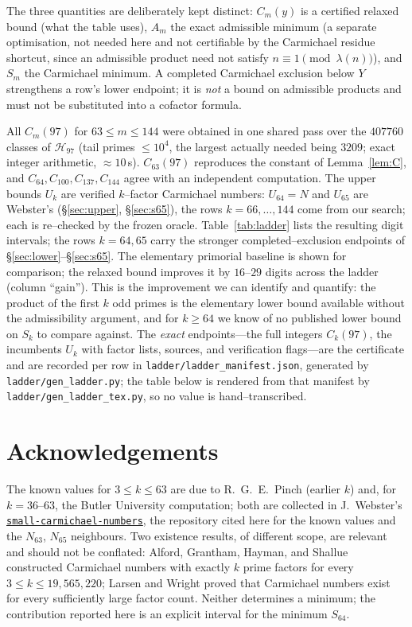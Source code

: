 \documentclass[11pt]{article}
\theoremstyle{definition}
\newcommand{\code}[1]{\texttt{#1}}
\begin{document}
The three quantities are deliberately kept distinct: $C_m(y)$ is a certified relaxed bound (what
the table uses), $A_m$ the exact admissible minimum (a separate optimisation, not needed here and not
certifiable by the Carmichael residue shortcut, since an admissible product need not satisfy
$n\equiv1\pmod{\lambda(n)}$), and $S_m$ the Carmichael minimum. A completed Carmichael exclusion
below $Y$ strengthens a row's lower endpoint; it is \emph{not} a bound on admissible products and must
not be substituted into a cofactor formula.

All $C_m(97)$ for $63\le m\le144$ were obtained in one shared pass over the $407760$ classes of
$\mathcal H_{97}$ (tail primes $\le10^4$, the largest actually needed being $3209$; exact integer
arithmetic, $\approx10$\,s). $C_{63}(97)$ reproduces the constant of Lemma~\ref{lem:C}, and
$C_{64},C_{100},C_{137},C_{144}$ agree with an independent computation. The upper bounds $U_k$ are
verified $k$--factor Carmichael numbers: $U_{64}=N$ and $U_{65}$ are Webster's (\S\ref{sec:upper},
\S\ref{sec:s65}), the rows $k=66,\dots,144$ come from our search; each is re--checked by the frozen
oracle. Table~\ref{tab:ladder} lists the resulting
digit intervals; the rows $k=64,65$ carry the stronger completed--exclusion endpoints of
\S\ref{sec:lower}--\S\ref{sec:s65}. The elementary primorial baseline is shown for comparison; the
relaxed bound improves it by $16$--$29$ digits across the ladder (column ``gain''). This is the
improvement we can identify and quantify: the product of the first $k$ odd primes is the elementary
lower bound available without the admissibility argument, and for $k\ge 64$ we know of no published
lower bound on $S_k$ to compare against. The \emph{exact} endpoints---the full integers $C_k(97)$,
the incumbents $U_k$ with factor lists, sources, and verification flags---are the certificate and are
recorded per row in \code{ladder/ladder\_manifest.json}, generated by \code{ladder/gen\_ladder.py};
the table below is rendered from that manifest by \code{ladder/gen\_ladder\_tex.py}, so no value is
hand--transcribed.

\small

\normalsize

\section*{Acknowledgements}

The known values for $3\le k\le 63$ are due to R.~G.~E.~Pinch (earlier $k$) and, for $k=36$--$63$,
the Butler University computation; both are collected in J.~Webster's
\href{https://github.com/jewebste/small-carmichael-numbers}{\code{small-carmichael-numbers}}, the
repository cited here for the known values and the $N_{63}$, $N_{65}$ neighbours. Two existence
results, of different scope, are relevant and should not be conflated: Alford, Grantham, Hayman, and
Shallue constructed Carmichael numbers with exactly $k$ prime factors for every
$3\le k\le 19{,}565{,}220$; Larsen and Wright proved that Carmichael numbers exist for every
sufficiently large factor count. Neither determines a minimum; the contribution reported here is an
explicit interval for the minimum $S_{64}$.
\end{document}
